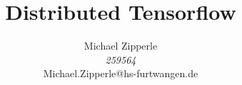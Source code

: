 \documentclass[journal]{IEEEtran}
\begin{document}
\title{Distributed Tensorflow}

\author{\begin{center}
 Michael Zipperle \\ 
 \textit{259564} \\
 Michael.Zipperle@hs-furtwangen.de \\
\end{center}}%
        

\maketitle


\begin{abstract}


\end{abstract}
\IEEEpeerreviewmaketitle











\ifCLASSOPTIONcaptionsoff
  \newpage
\fi
\end{document}
